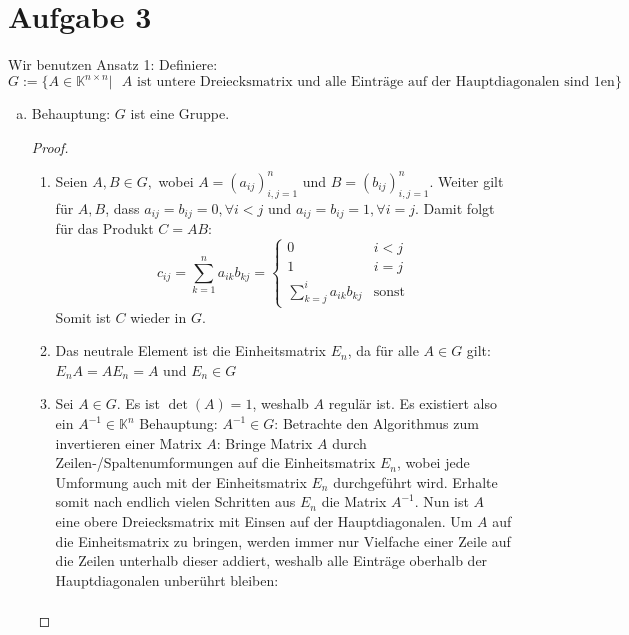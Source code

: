 \documentclass{article}
\theoremstyle{definition}
\begin{document}
\section*{Aufgabe 3}
Wir benutzen Ansatz 1:\newline
Definiere: $G:=\{A\in \mathbb{K}^{n\times n}|\text{ }A \text{ ist untere Dreiecksmatrix und alle Einträge auf der Hauptdiagonalen sind 1en}\}$
\begin{enumerate}[(a)]
    \item Behauptung: $G$ ist eine Gruppe.
          \begin{proof}
              \begin{enumerate}[(G1)]
                  \item Seien $A,B\in G,$ wobei $A=(a_{ij})_{i,j=1}^{n}$ und $B=(b_{ij})_{i,j=1}^{n}.$ Weiter gilt für $A,B$, dass $a_{ij}=b_{ij}=0,\forall i<j$ und $a_{ij}=b_{ij}=1,\forall i=j$. Damit folgt für das Produkt $C=AB$:
                        $$ c_{ij}=\sum_{k=1}^{n}a_{ik}b_{kj}=\left\{\begin{array}{cc}
                                0                                 & i<j          \\
                                1                                 & i=j          \\
                                \sum\limits_{k=j}^{i}a_{ik}b_{kj} & \text{sonst}
                            \end{array}\right.$$
                        Somit ist $C$ wieder in $G$.
                  \item Das neutrale Element ist die Einheitsmatrix $E_n$, da für alle $A\in G$ gilt: $E_nA=AE_n= A$ und $E_n\in G$
                  \item Sei $A\in G$. Es ist $\det(A)=1$, weshalb $A$ regulär ist. Es existiert also ein $A^{-1}\in \mathbb{K}^n$\newline
                        Behauptung: $A^{-1}\in G$:
                        Betrachte den Algorithmus zum invertieren einer Matrix $A$: Bringe Matrix $A$ durch Zeilen-/Spaltenumformungen auf die Einheitsmatrix $E_n$, wobei jede Umformung auch mit der Einheitsmatrix $E_n$ durchgeführt wird. Erhalte somit nach endlich vielen Schritten aus $E_n$ die Matrix $A^{-1}.$ Nun ist $A$ eine obere Dreiecksmatrix mit Einsen auf der Hauptdiagonalen. Um $A$ auf die Einheitsmatrix zu bringen, werden immer nur Vielfache einer Zeile auf die Zeilen unterhalb dieser addiert, weshalb alle Einträge oberhalb der Hauptdiagonalen unberührt bleiben:
                        \begin{align*}

\end{align*}
\end{enumerate}
\end{proof}
\end{enumerate}
\end{document}
